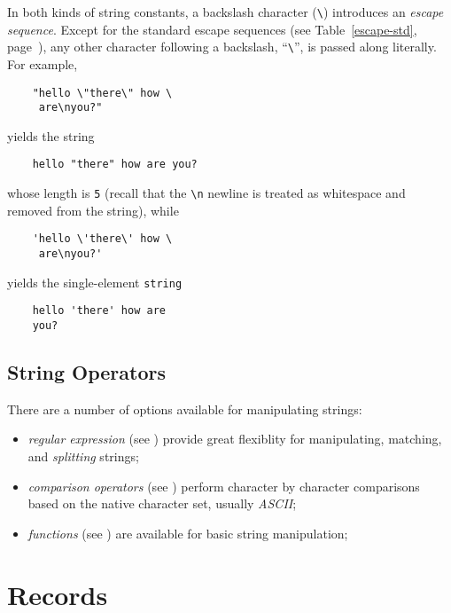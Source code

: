 In both kinds of string constants, a backslash character (\verb+\+) 
introduces an {\em escape sequence\/}.  Except for the standard
escape sequences (see Table~\ref{escape-std}, page~\pageref{escape-std}), any other character
following a backslash, ``\verb+\+'', is passed along literally.
For example,
\begin{verbatim}
    "hello \"there\" how \
     are\nyou?"
\end{verbatim}
yields the string
\begin{verbatim}
    hello "there" how are you?
\end{verbatim}
whose length is {\tt 5} (recall that the \verb+\n+ newline is treated as 
whitespace and removed from the string), while
\begin{verbatim}
    'hello \'there\' how \
     are\nyou?'
\end{verbatim}
yields the single-element {\tt string}
\begin{verbatim}
    hello 'there' how are
    you?
\end{verbatim}

\subsection{String Operators}

There are a number of options available for manipulating strings:

\begin{itemize}

\item {\em regular expression} (see ) provide
great flexiblity for manipulating, matching, and {\em splitting}
strings;

\item {\em comparison operators} (see ) perform
character by character comparisons based on the native character set,
usually {\em ASCII};

\item {\em functions} (see ) are available
for basic string manipulation;
\end{itemize}


\section{Records}
\label{records}


